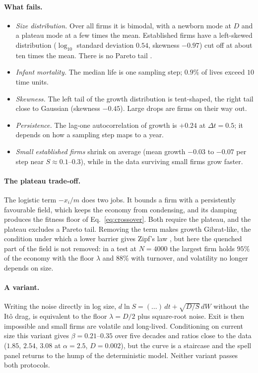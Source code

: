 \documentclass[pre,twocolumn,superscriptaddress,nofootinbib]{revtex4-2}
\begin{document}
\paragraph{What fails.}
\begin{itemize}
\item \emph{Size distribution.}  Over all firms it is bimodal, with a newborn mode at $D$ and a plateau
  mode at a few times the mean.  Established firms have a left-skewed distribution
  ($\log_{10}$ standard deviation $0.54$, skewness $-0.97$) cut off at about ten times the mean.
  There is no Pareto tail \cite{axtell2001}.
\item \emph{Infant mortality.}  The median life is one sampling step; $0.9\%$ of lives exceed $10$
  time units.
\item \emph{Skewness.}  The left tail of the growth distribution is tent-shaped, the right tail close to
  Gaussian (skewness $-0.45$).  Large drops are firms on their way out.
\item \emph{Persistence.}  The lag-one autocorrelation of growth is $+0.24$ at $\Delta t=0.5$; it depends on
  how a sampling step maps to a year.
\item \emph{Small established firms} shrink on average (mean growth $-0.03$ to $-0.07$ per step near
  $S\approx0.1$--$0.3$), while in the data surviving small firms grow faster.
\end{itemize}

\paragraph{The plateau trade-off.}  The logistic term $-x_i/m$ does two jobs.  It bounds a firm with a
persistently favourable field, which keeps the economy from condensing, and its damping produces
the fitness floor of Eq.~\eqref{eq:crossover}.  Both require the plateau, and the plateau excludes a
Pareto tail.  Removing the term makes growth Gibrat-like, the condition under which a lower barrier
gives Zipf's law \cite{gabaix1999}, but here the quenched part of the field is not removed: in a test
at $N=4000$ the largest firm holds $95\%$ of the economy with the floor $\lambda$ and $88\%$ with
turnover, and volatility no longer depends on size.

\paragraph{A variant.}  Writing the noise directly in log size, $d\ln S=(\ldots)\,dt+\sqrt{D/S}\,dW$ without the
It\^o drag, is equivalent to the floor $\lambda=D/2$ plus square-root noise.  Exit is then impossible
and small firms are volatile and long-lived.  Conditioning on current size this variant gives
$\beta=0.21$--$0.35$ over five decades and ratios close to the data ($1.85$, $2.54$, $3.08$ at $\alpha=2.5$,
$D=0.002$), but the curve is a staircase and the spell panel returns to the hump of the
deterministic model.  Neither variant passes both protocols.
\end{document}
